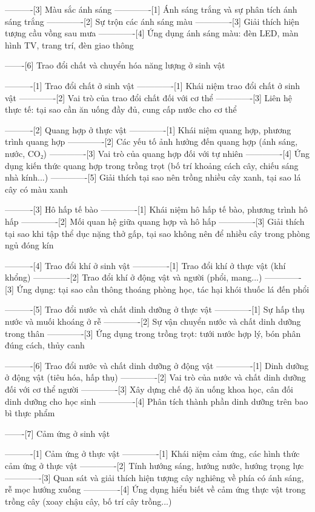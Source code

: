 ----------[3] Màu sắc ánh sáng
-------------[1] Ánh sáng trắng và sự phân tích ánh sáng trắng
-------------[2] Sự trộn các ánh sáng màu
-------------[3] Giải thích hiện tượng cầu vồng sau mưa
-------------[4] Ứng dụng ánh sáng màu: đèn LED, màn hình TV, trang trí, đèn giao thông

-------[6] Trao đổi chất và chuyển hóa năng lượng ở sinh vật

----------[1] Trao đổi chất ở sinh vật
-------------[1] Khái niệm trao đổi chất ở sinh vật
-------------[2] Vai trò của trao đổi chất đối với cơ thể
-------------[3] Liên hệ thực tế: tại sao cần ăn uống đầy đủ, cung cấp nước cho cơ thể

----------[2] Quang hợp ở thực vật
-------------[1] Khái niệm quang hợp, phương trình quang hợp
-------------[2] Các yếu tố ảnh hưởng đến quang hợp (ánh sáng, nước, CO₂)
-------------[3] Vai trò của quang hợp đối với tự nhiên
-------------[4] Ứng dụng kiến thức quang hợp trong trồng trọt (bố trí khoảng cách cây, chiếu sáng nhà kính...)
-------------[5] Giải thích tại sao nên trồng nhiều cây xanh, tại sao lá cây có màu xanh

----------[3] Hô hấp tế bào
-------------[1] Khái niệm hô hấp tế bào, phương trình hô hấp
-------------[2] Mối quan hệ giữa quang hợp và hô hấp
-------------[3] Giải thích tại sao khi tập thể dục nặng thở gấp, tại sao không nên để nhiều cây trong phòng ngủ đóng kín

----------[4] Trao đổi khí ở sinh vật
-------------[1] Trao đổi khí ở thực vật (khí khổng)
-------------[2] Trao đổi khí ở động vật và người (phổi, mang...)
-------------[3] Ứng dụng: tại sao cần thông thoáng phòng học, tác hại khói thuốc lá đến phổi

----------[5] Trao đổi nước và chất dinh dưỡng ở thực vật
-------------[1] Sự hấp thụ nước và muối khoáng ở rễ
-------------[2] Sự vận chuyển nước và chất dinh dưỡng trong thân
-------------[3] Ứng dụng trong trồng trọt: tưới nước hợp lý, bón phân đúng cách, thủy canh

----------[6] Trao đổi nước và chất dinh dưỡng ở động vật
-------------[1] Dinh dưỡng ở động vật (tiêu hóa, hấp thụ)
-------------[2] Vai trò của nước và chất dinh dưỡng đối với cơ thể người
-------------[3] Xây dựng chế độ ăn uống khoa học, cân đối dinh dưỡng cho học sinh
-------------[4] Phân tích thành phần dinh dưỡng trên bao bì thực phẩm

-------[7] Cảm ứng ở sinh vật

----------[1] Cảm ứng ở thực vật
-------------[1] Khái niệm cảm ứng, các hình thức cảm ứng ở thực vật
-------------[2] Tính hướng sáng, hướng nước, hướng trọng lực
-------------[3] Quan sát và giải thích hiện tượng cây nghiêng về phía có ánh sáng, rễ mọc hướng xuống
-------------[4] Ứng dụng hiểu biết về cảm ứng thực vật trong trồng cây (xoay chậu cây, bố trí cây trồng...)

